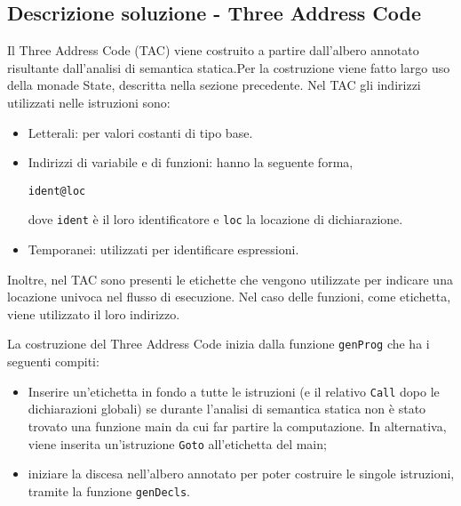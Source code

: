 \subsection{Descrizione soluzione - Three Address Code}

Il Three Address Code (TAC) viene costruito a partire dall'albero annotato risultante dall'analisi di semantica statica.Per la costruzione viene fatto largo uso della monade State, descritta nella sezione precedente.
Nel TAC gli indirizzi utilizzati nelle istruzioni sono:
\begin{itemize}
    \item Letterali: per valori costanti di tipo base.
    \item Indirizzi di variabile e di funzioni: hanno la seguente forma,
    \begin{center}
        {\tt ident@loc}
    \end{center}
    dove {\tt ident} è il loro identificatore e {\tt loc} la locazione di dichiarazione.
    \item Temporanei: utilizzati per identificare espressioni.
\end{itemize}
Inoltre, nel TAC sono presenti le etichette che vengono utilizzate per indicare una locazione univoca nel flusso di esecuzione. Nel caso delle funzioni, come etichetta, viene utilizzato il loro indirizzo.

La costruzione del Three Address Code inizia dalla funzione {\tt genProg} che ha i seguenti compiti:
\begin{itemize}
    \item Inserire un'etichetta in fondo a tutte le istruzioni (e il relativo {\tt Call} dopo le dichiarazioni globali) se durante l'analisi di semantica statica non è stato trovato una funzione main da cui far partire la computazione. In alternativa, viene inserita un'istruzione {\tt Goto} all'etichetta del main;
    \item iniziare la discesa nell'albero annotato per poter costruire le singole istruzioni, tramite la funzione {\tt genDecls}.
\end{itemize}

